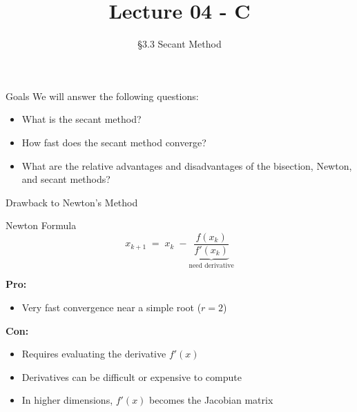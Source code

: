 \documentclass[10pt]{beamer}
\title[Math/CS 375]{Lecture 04 - C}
\subtitle{\S 3.3 Secant Method}
\begin{document}
\begin{frame}
  \titlepage
\end{frame}
\begin{frame}{Goals}
We will answer the following questions:\\[3mm]
\begin{itemize}
    \item What is the secant method?
    \item How fast does the secant method converge?
    \item What are the relative advantages and disadvantages of the bisection, Newton, and secant methods?
\end{itemize}
\end{frame}

\begin{frame}{Drawback to Newton's Method}

\begin{block}{Newton Formula}
\[
x_{k+1}
\;=\;
x_k\;-\underbrace{\frac{f(x_k)}{f'(x_k)}}_{\text{need derivative}}
\]
\end{block}

\vfill

\textbf{Pro:}
\begin{itemize}
    \item Very fast convergence near a simple root ($r=2$)
\end{itemize}

\vfill

\textbf{Con:}
\begin{itemize}
    \item Requires evaluating the derivative $f'(x)$
    \item Derivatives can be difficult or expensive to compute
    \item In higher dimensions, $f'(x)$ becomes the Jacobian matrix
\end{itemize}

\vfill


\end{frame}
\end{document}
